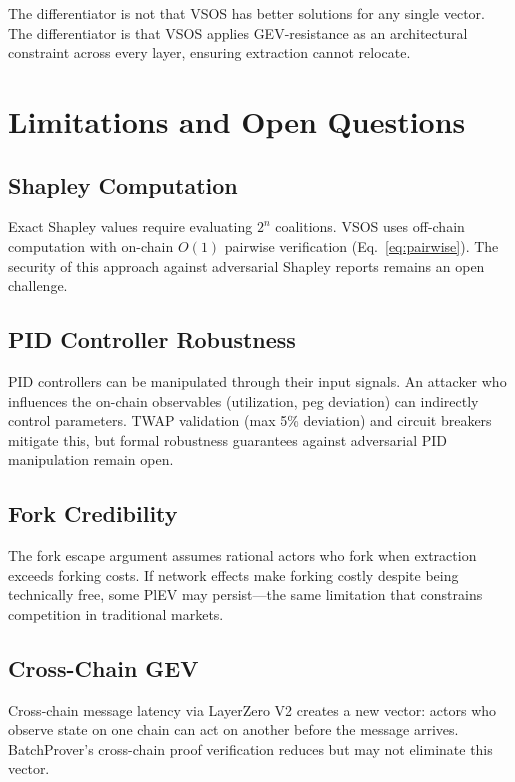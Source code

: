 \documentclass[11pt, a4paper]{article}
\begin{document}
The differentiator is not that VSOS has better solutions for any single vector. The differentiator is that VSOS applies GEV-resistance as an architectural constraint across every layer, ensuring extraction cannot relocate.

\section{Limitations and Open Questions}

\subsection{Shapley Computation}
Exact Shapley values require evaluating $2^n$ coalitions. VSOS uses off-chain computation with on-chain $O(1)$ pairwise verification (Eq.~\ref{eq:pairwise}). The security of this approach against adversarial Shapley reports remains an open challenge.

\subsection{PID Controller Robustness}
PID controllers can be manipulated through their input signals. An attacker who influences the on-chain observables (utilization, peg deviation) can indirectly control parameters. TWAP validation (max 5\% deviation) and circuit breakers mitigate this, but formal robustness guarantees against adversarial PID manipulation remain open.

\subsection{Fork Credibility}
The fork escape argument assumes rational actors who fork when extraction exceeds forking costs. If network effects make forking costly despite being technically free, some PlEV may persist---the same limitation that constrains competition in traditional markets.

\subsection{Cross-Chain GEV}
Cross-chain message latency via LayerZero V2 creates a new vector: actors who observe state on one chain can act on another before the message arrives. BatchProver's cross-chain proof verification reduces but may not eliminate this vector.

\end{document}
